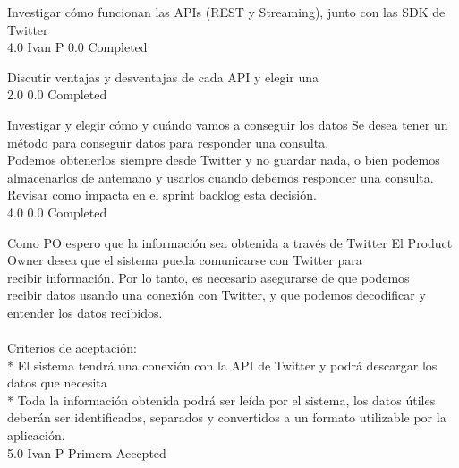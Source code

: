 		{Investigar cómo funcionan las APIs (REST y Streaming), junto con las SDK de Twitter} %
		{\\
} %
		{4.0} %
		{Ivan P} %
		{0.0} %
		{Completed} %

		{Discutir ventajas y desventajas de cada API y elegir una} %
		{\\
} %
		{2.0} %
		{} %
		{0.0} %
		{Completed} %

		{Investigar y elegir cómo y cuándo vamos a conseguir los datos} %
		{Se desea tener un método para conseguir datos para responder una consulta.\\
Podemos obtenerlos siempre desde Twitter y no guardar nada, o bien podemos\\
almacenarlos de antemano y usarlos cuando debemos responder una consulta.\\
Revisar como impacta en el sprint backlog esta decisión.\\
} %
		{4.0} %
		{} %
		{0.0} %
		{Completed} %


\vspace{20pt}

	{Como PO espero que la información sea obtenida a través de Twitter} %
	{El Product Owner desea que el sistema pueda comunicarse con Twitter para\\
recibir información. Por lo tanto, es necesario asegurarse de que podemos\\
recibir datos usando una conexión con Twitter, y que podemos decodificar y\\
entender los datos recibidos.\\
  \\
Criterios de aceptación:\\
* El sistema tendrá una conexión con la API de Twitter y podrá descargar los datos que necesita  \\
* Toda la información obtenida podrá ser leída por el sistema, los datos útiles deberán ser identificados, separados y convertidos a un formato utilizable por la aplicación.\\
} %
	{} %
	{5.0} %
	{Ivan P} %
	{Primera} %
	{Accepted} %

